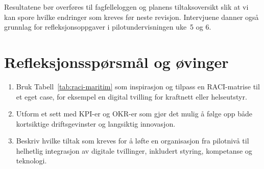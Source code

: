 Resultatene bør overføres til fagfelleloggen og planens tiltaksoversikt slik at vi kan spore hvilke endringer som kreves før neste revisjon. Intervjuene danner også grunnlag for refleksjonsoppgaver i pilotundervisningen uke~5 og 6.

\section{Refleksjonsspørsmål og øvinger}
\begin{enumerate}
    \item Bruk Tabell~\ref{tab:raci-maritim} som inspirasjon og tilpass en RACI-matrise til et eget case, for eksempel en digital tvilling for kraftnett eller helseutstyr.
    \item Utform et sett med KPI-er og OKR-er som gjør det mulig å følge opp både kortsiktige driftsgevinster og langsiktig innovasjon.
    \item Beskriv hvilke tiltak som kreves for å løfte en organisasjon fra pilotnivå til helhetlig integrasjon av digitale tvillinger, inkludert styring, kompetanse og teknologi.
\end{enumerate}
